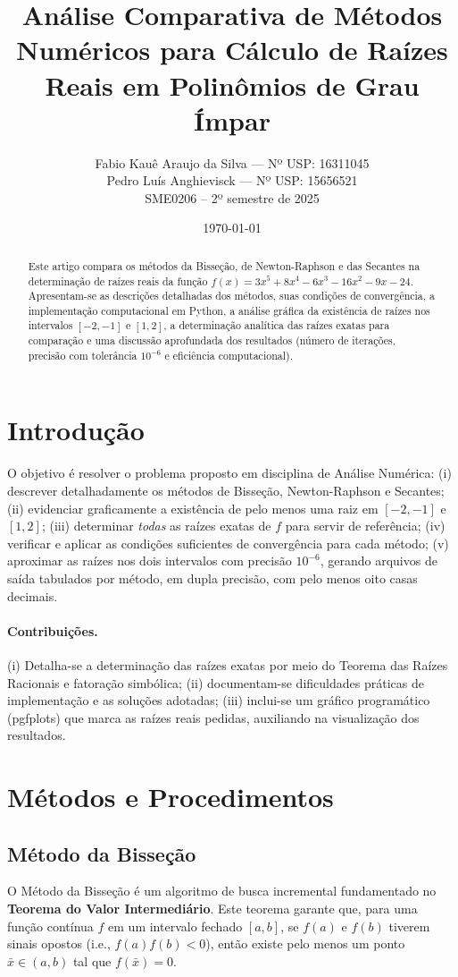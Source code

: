 \documentclass[12pt,a4paper]{article}
\title{Análise Comparativa de Métodos Numéricos para Cálculo de Raízes Reais em Polinômios de Grau Ímpar}
\author{
  Fabio Kauê Araujo da Silva --- Nº USP: 16311045 \\[3pt]
  Pedro Luís Anghievisck --- Nº USP: 15656521 \\[3pt]
  \normalsize SME0206 -- 2º semestre de 2025
}
\date{\today}
\begin{document}
\maketitle

\begin{abstract}
Este artigo compara os métodos da Bisseção, de Newton-Raphson e das Secantes na determinação de raízes reais da função
$f(x)=3x^{5}+8x^{4}-6x^{3}-16x^{2}-9x-24$.
Apresentam-se as descrições detalhadas dos métodos, suas condições de convergência, a implementação computacional em Python,
a análise gráfica da existência de raízes nos intervalos $[-2,-1]$ e $[1,2]$, a determinação analítica das raízes exatas para comparação e
uma discussão aprofundada dos resultados (número de iterações, precisão com tolerância $10^{-6}$ e eficiência computacional).
\end{abstract}

\section{Introdução}
O objetivo é resolver o problema proposto em disciplina de Análise Numérica:
(i) descrever detalhadamente os métodos de Bisseção, Newton-Raphson e Secantes; (ii) evidenciar graficamente a existência de pelo menos uma raiz em
$[-2,-1]$ e $[1,2]$; (iii) determinar \emph{todas} as raízes exatas de $f$ para servir de referência;
(iv) verificar e aplicar as condições suficientes de convergência para cada método; (v) aproximar as raízes nos dois intervalos com precisão $10^{-6}$,
gerando arquivos de saída tabulados por método, em dupla precisão, com pelo menos oito casas decimais.

\paragraph{Contribuições.}
(i) Detalha-se a determinação das raízes exatas por meio do Teorema das Raízes Racionais e fatoração simbólica; (ii) documentam-se dificuldades práticas de implementação
e as soluções adotadas; (iii) inclui-se um gráfico programático (pgfplots) que marca as raízes reais pedidas, auxiliando na visualização dos resultados.

\section{Métodos e Procedimentos}
\subsection{Método da Bisseção}
O Método da Bisseção é um algoritmo de busca incremental fundamentado no \textbf{Teorema do Valor Intermediário}. Este teorema garante que, para uma função contínua $f$ em um intervalo fechado $[a,b]$, se $f(a)$ e $f(b)$ tiverem sinais opostos (i.e., $f(a)f(b)<0$), então existe pelo menos um ponto $\bar{x} \in (a,b)$ tal que $f(\bar{x})=0$.
\end{document}
